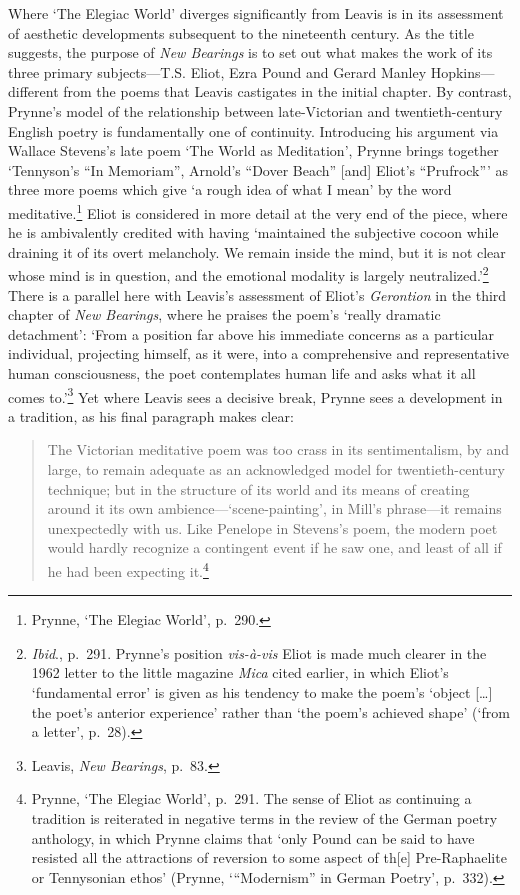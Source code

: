 \documentclass[]{article}
\begin{document}
\noindent Where ‘The Elegiac World’ diverges significantly from Leavis
is in its assessment of aesthetic developments subsequent to the
nineteenth century. As the title suggests, the purpose of \emph{New
Bearings} is to set out what makes the work of its three primary
subjects—T.S. Eliot, Ezra Pound and Gerard Manley Hopkins—different from
the poems that Leavis castigates in the initial chapter. By contrast,
Prynne’s model of the relationship between late-Victorian and
twentieth-century English poetry is fundamentally one of continuity.
Introducing his argument via Wallace Stevens’s late poem ‘The World as
Meditation’, Prynne brings together ‘Tennyson’s “In Memoriam”, Arnold’s
“Dover Beach” {[}and{]} Eliot’s “Prufrock”’ as three more poems which
give ‘a rough idea of what I mean’ by the word meditative.\footnote{Prynne,
  ‘The Elegiac World’, p.~290.} Eliot is considered in more detail at
the very end of the piece, where he is ambivalently credited with having
‘maintained the subjective cocoon while draining it of its overt
melancholy. We remain inside the mind, but it is not clear whose mind is
in question, and the emotional modality is largely
neutralized.’\footnote{\emph{Ibid}., p.~291. Prynne’s position
  \emph{vis-à-vis} Eliot is made much clearer in the 1962 letter to the
  little magazine \emph{Mica} cited earlier, in which Eliot’s
  ‘fundamental error’ is given as his tendency to make the poem’s
  ‘object {[}\ldots{}{]} the poet’s anterior experience’ rather than
  ‘the poem’s achieved shape’ (‘from a letter’, p.~28).} There is a
parallel here with Leavis’s assessment of Eliot’s \emph{Gerontion} in
the third chapter of \emph{New Bearings}, where he praises the poem’s
‘really dramatic detachment’: ‘From a position far above his immediate
concerns as a particular individual, projecting himself, as it were,
into a comprehensive and representative human consciousness, the poet
contemplates human life and asks what it all comes to.’\footnote{Leavis,
  \emph{New Bearings}, p.~83.} Yet where Leavis sees a decisive break,
Prynne sees a development in a tradition, as his final paragraph makes
clear:

\begin{quote}
\singlespacing The Victorian meditative poem was too crass in its
sentimentalism, by and large, to remain adequate as an acknowledged
model for twentieth-century technique; but in the structure of its world
and its means of creating around it its own ambience—‘scene-painting’,
in Mill’s phrase—it remains unexpectedly with us. Like Penelope in
Stevens’s poem, the modern poet would hardly recognize a contingent
event if he saw one, and least of all if he had been expecting
it.\footnote{Prynne, ‘The Elegiac World’, p.~291. The sense of Eliot as
  continuing a tradition is reiterated in negative terms in the review
  of the German poetry anthology, in which Prynne claims that ‘only
  Pound can be said to have resisted all the attractions of reversion to
  some aspect of th{[}e{]} Pre-Raphaelite or Tennysonian ethos’ (Prynne,
  ‘“Modernism” in German Poetry’, p.~332).}
\end{quote}
\end{document}
